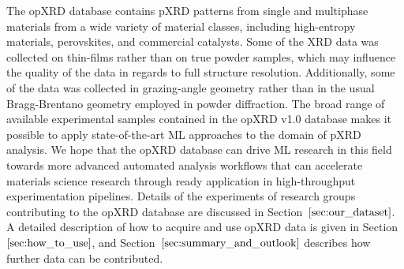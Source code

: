 The opXRD database contains pXRD patterns from single and multiphase materials from a wide variety of material classes, including high-entropy materials, perovskites, and commercial catalysts. Some of the XRD data was collected on thin-films rather than on true powder samples, which may influence the quality of the data in regards to full structure resolution. Additionally, some of the data was collected in grazing-angle geometry rather than in the usual Bragg-Brentano geometry employed in powder diffraction.
The broad range of available experimental samples contained in the opXRD v1.0 database makes it possible to apply state-of-the-art ML approaches to the domain of pXRD analysis. We hope that the opXRD database can drive ML research in this field towards more advanced automated analysis workflows that can accelerate materials science research through ready application in high-throughput experimentation pipelines. Details of the experiments of research groups contributing to the opXRD database are discussed in Section~$\eqref{sec:our_dataset}$. A detailed description of how to acquire and use opXRD data is given in Section~$\eqref{sec:how_to_use}$, and Section~$\eqref{sec:summary_and_outlook}$ describes how further data can be contributed.